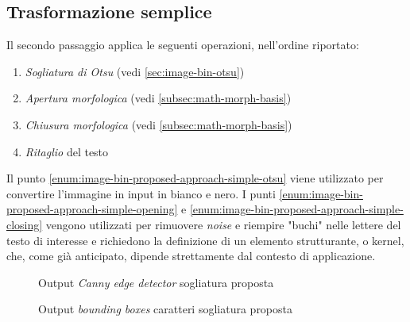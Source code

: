 \subsection{Trasformazione semplice}
\label{subsec:image-bin-proposed-approach-simple}
Il secondo passaggio applica le seguenti operazioni, nell'ordine riportato:
\begin{enumerate}
	\item\label{enum:image-bin-proposed-approach-simple-otsu} \textit{Sogliatura di Otsu} (vedi \ref{sec:image-bin-otsu})
	\item\label{enum:image-bin-proposed-approach-simple-opening} \textit{Apertura morfologica} (vedi \ref{subsec:math-morph-basis})
	\item\label{enum:image-bin-proposed-approach-simple-closing} \textit{Chiusura morfologica} (vedi \ref{subsec:math-morph-basis})
	\item\label{enum:image-bin-proposed-approach-simple-cut} \textit{Ritaglio} del testo
\end{enumerate}
Il punto \ref{enum:image-bin-proposed-approach-simple-otsu} viene utilizzato per convertire l'immagine in input in bianco e nero. I punti \ref{enum:image-bin-proposed-approach-simple-opening} e \ref{enum:image-bin-proposed-approach-simple-closing} vengono utilizzati per rimuovere \textit{noise} e riempire "buchi" nelle lettere del testo di interesse e richiedono la definizione di un elemento strutturante, o kernel, che, come gi\`a anticipato, dipende strettamente dal contesto di applicazione.\par
\setcounter{totalnumber}{2}
\begin{figure}[H]
	\centering
	\caption{Output \textit{Canny edge detector} sogliatura proposta}
	\label{fig:image-bin-proposed-approach-canny}
\end{figure}
\begin{figure}[H]
	\centering
	\caption{Output \textit{bounding boxes} caratteri sogliatura proposta}
	\label{fig:image-bin-proposed-approach-chars}
\end{figure}
